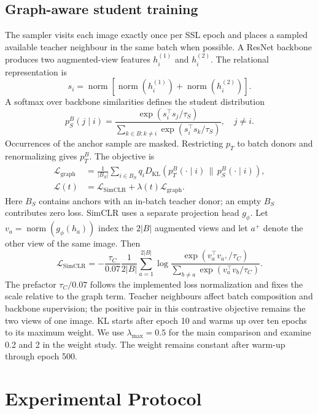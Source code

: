 \documentclass{article}
\begin{document}
\subsection{Graph-aware student training}
The sampler visits each image exactly once per SSL epoch and places a sampled
available teacher neighbour in the same batch when possible. A ResNet backbone
produces two augmented-view features $h_i^{(1)}$ and $h_i^{(2)}$. The relational
representation is
\begin{equation}
 s_i=\operatorname{norm}\!\left[\operatorname{norm}(h_i^{(1)})+
 \operatorname{norm}(h_i^{(2)})\right].
\end{equation}
A softmax over backbone similarities defines the student distribution
\begin{equation}
 p_S^B(j\mid i)=\frac{\exp(s_i^\top s_j/\tau_S)}
 {\sum_{k\in B:k\ne i}\exp(s_i^\top s_k/\tau_S)},\quad j\ne i.
\end{equation} Occurrences of the anchor sample are masked. Restricting
$p_T$ to batch donors and renormalizing gives $p_T^B$. The objective is
\begin{align}
 \mathcal{L}_{\mathrm{graph}}&=\frac{1}{|B_S|}\sum_{i\in B_S}q_i
 D_{\mathrm{KL}}\!\left(p_T^B(\cdot\mid i)\,\|\,p_S^B(\cdot\mid i)\right),\\
 \mathcal{L}(t)&=\mathcal{L}_{\mathrm{SimCLR}}+
 \lambda(t)\mathcal{L}_{\mathrm{graph}}.
\end{align}
Here $B_S$ contains anchors with an in-batch teacher donor; an empty $B_S$
contributes zero loss. SimCLR uses a separate projection head $g_\phi$.
Let $v_a=\operatorname{norm}(g_\phi(h_a))$ index the $2|B|$ augmented views
and let $a^+$ denote the other view of the same image. Then
\begin{equation}
 \mathcal{L}_{\mathrm{SimCLR}}=-\frac{\tau_C}{0.07}\frac{1}{2|B|}\sum_{a=1}^{2|B|}
 \log\frac{\exp(v_a^\top v_{a^+}/\tau_C)}
 {\sum_{b\ne a}\exp(v_a^\top v_b/\tau_C)}.
\end{equation}
The prefactor $\tau_C/0.07$ follows the implemented loss normalization and
fixes the scale relative to the graph term. Teacher neighbours affect batch
composition and backbone supervision; the
positive pair in this contrastive objective remains the two views of one image.
KL starts after epoch 10 and warms up over ten epochs to its maximum weight.
We use $\lambda_{\max}=0.5$ for the main comparison and examine 0.2 and 2
in the weight study. The weight remains constant after warm-up through epoch 500.

\section{Experimental Protocol}
\end{document}

